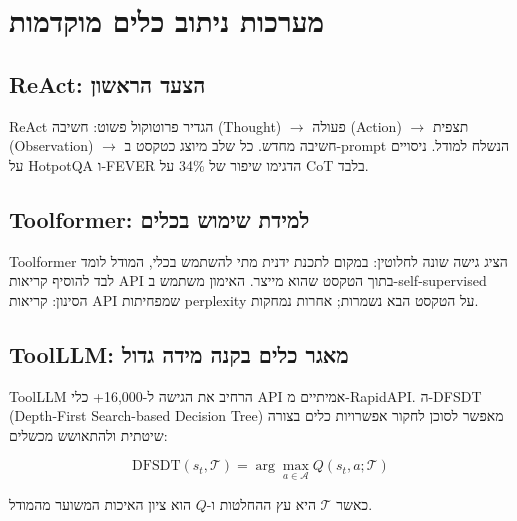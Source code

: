 
\clearpage
\chapter{מערכות ניתוב כלים מוקדמות}

\section{\textenglish{ReAct}: הצעד הראשון}

\textenglish{ReAct} \cite{yao2022react} הגדיר פרוטוקול פשוט: חשיבה (\textenglish{Thought}) $\to$ פעולה (\textenglish{Action}) $\to$ תצפית (\textenglish{Observation}) $\to$ חשיבה מחדש. כל שלב מיוצג כטקסט ב-\textenglish{prompt} הנשלח למודל. ניסויים על \textenglish{HotpotQA} ו-\textenglish{FEVER} הדגימו שיפור של \textenglish{34\%} על \textenglish{CoT} בלבד.

\section{\textenglish{Toolformer}: למידת שימוש בכלים}

\textenglish{Toolformer} \cite{schick2023toolformer} הציג גישה שונה לחלוטין: במקום לתכנת ידנית מתי להשתמש בכלי, המודל לומד לבד להוסיף קריאות \textenglish{API} בתוך הטקסט שהוא מייצר. האימון משתמש ב\textenglish{-self-supervised} הסינון: קריאות \textenglish{API} שמפחיתות \textenglish{perplexity} על הטקסט הבא נשמרות; אחרות נמחקות.

\section{\textenglish{ToolLLM}: מאגר כלים בקנה מידה גדול}

\textenglish{ToolLLM} \cite{qin2023toolllm} הרחיב את הגישה ל-\textenglish{16,000+} כלי \textenglish{API} אמיתיים מ-\textenglish{RapidAPI}. ה-\textenglish{DFSDT} (\textenglish{Depth-First Search-based Decision Tree}) מאפשר לסוכן לחקור אפשרויות כלים בצורה שיטתית ולהתאושש מכשלים:

\begin{equation}
\text{DFSDT}(s_t, \mathcal{T}) = \arg\max_{a \in \mathcal{A}} Q(s_t, a; \mathcal{T})
\end{equation}

כאשר \(\mathcal{T}\) היא עץ ההחלטות ו-\(Q\) הוא ציון האיכות המשוער מהמודל.
